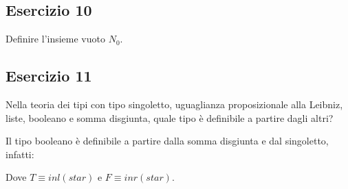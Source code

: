 \subsection{Esercizio 10}
\begin{thm}
	Definire l'insieme vuoto $N_0$.
\end{thm}


\subsection{Esercizio 11}
\begin{thm}
	Nella teoria dei tipi con tipo singoletto, uguaglianza proposizionale alla Leibniz, liste, booleano e somma disgiunta, quale tipo è definibile a partire dagli altri?
\end{thm}
Il tipo booleano è definibile a partire dalla somma disgiunta e dal singoletto, infatti:

Dove $T \equiv inl (star)$ e $F \equiv inr (star)$.
